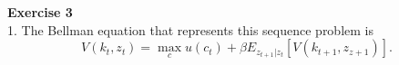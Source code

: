 \documentclass[letterpaper,12pt]{article}
\theoremstyle{definition}
\begin{document}
\newpage

\textbf{Exercise 3}\\
1. The Bellman equation that represents this sequence problem is
\begin{equation*}
  V(k_t, z_t) = \max_{c} u(c_t) + \beta E_{z_{t+1} | {z_t}}[V(k_{t+1}, z_{z+1})] .
\end{equation*}

\begin{figure}[H]\centering\captionsetup{width=0in}
\end{figure}
\end{document}
